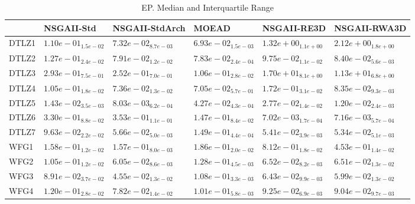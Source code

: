 \documentclass{article}
\begin{document}
\begin{table}
\caption{EP. Median and Interquartile Range}
\label{table: EP}
\centering
\begin{scriptsize}
\begin{tabular}{llllll}
\hline & NSGAII-Std & NSGAII-StdArch & MOEAD & NSGAII-RE3D &  NSGAII-RWA3D\\
\hline 
DTLZ1 & $  1.10e-01_{ 1.5e-02}$ & \cellcolor{gray25}$  7.32e-02_{ 8.7e-03}$ & \cellcolor{gray95}$  6.93e-02_{ 1.5e-03}$ & $  1.32e+00_{ 1.1e+00}$ & $  2.12e+00_{ 1.8e+00}$ \\
DTLZ2 & $  1.27e-01_{ 2.4e-02}$ & \cellcolor{gray25}$  7.91e-02_{ 1.2e-02}$ & \cellcolor{gray95}$  7.83e-02_{ 2.4e-04}$ & $  9.75e-02_{ 1.1e-02}$ & $  8.40e-02_{ 5.6e-03}$ \\
DTLZ3 & $  2.93e-01_{ 7.5e-01}$ & \cellcolor{gray25}$  2.52e-01_{ 7.0e-01}$ & \cellcolor{gray95}$  1.06e-01_{ 2.8e-02}$ & $  1.70e+01_{ 8.1e+00}$ & $  1.13e+01_{ 6.8e+00}$ \\
DTLZ4 & $  1.05e-01_{ 1.8e-02}$ & \cellcolor{gray25}$  7.36e-02_{ 1.3e-02}$ & \cellcolor{gray95}$  7.05e-02_{ 5.7e-01}$ & $  1.72e-01_{ 3.1e-02}$ & $  8.35e-02_{ 9.3e-03}$ \\
DTLZ5 & $  1.43e-02_{ 3.5e-03}$ & \cellcolor{gray95}$  8.03e-03_{ 6.2e-04}$ & $  4.27e-02_{ 4.3e-04}$ & $  2.77e-02_{ 1.4e-02}$ & \cellcolor{gray25}$  1.20e-02_{ 2.4e-03}$ \\
DTLZ6 & $  3.30e-01_{ 8.8e-02}$ & $  3.53e-01_{ 1.1e-01}$ & $  1.47e-01_{ 8.4e-02}$ & \cellcolor{gray95}$  7.02e-03_{ 1.7e-04}$ & \cellcolor{gray25}$  7.16e-03_{ 5.7e-04}$ \\
DTLZ7 & $  9.63e-02_{ 2.2e-02}$ & $  5.66e-02_{ 5.0e-03}$ & $  1.49e-01_{ 4.4e-04}$ & \cellcolor{gray25}$  5.41e-02_{ 3.9e-03}$ & \cellcolor{gray95}$  5.34e-02_{ 5.1e-03}$ \\
WFG1 & \cellcolor{gray25}$  1.58e-01_{ 1.2e-02}$ & \cellcolor{gray95}$  1.57e-01_{ 8.0e-03}$ & $  1.86e-01_{ 2.0e-02}$ & $  8.12e-01_{ 1.8e-02}$ & $  4.53e-01_{ 1.4e-02}$ \\
WFG2 & $  1.05e-01_{ 1.2e-02}$ & \cellcolor{gray95}$  6.05e-02_{ 8.6e-03}$ & $  1.28e-01_{ 4.5e-03}$ & $  6.52e-02_{ 8.2e-03}$ & \cellcolor{gray25}$  6.51e-02_{ 1.3e-02}$ \\
WFG3 & $  8.91e-02_{ 3.7e-02}$ & \cellcolor{gray95}$  4.55e-02_{ 1.3e-02}$ & $  1.08e-01_{ 3.3e-03}$ & $  6.43e-02_{ 9.9e-03}$ & \cellcolor{gray25}$  5.99e-02_{ 1.3e-02}$ \\
WFG4 & $  1.20e-01_{ 2.8e-02}$ & \cellcolor{gray95}$  7.82e-02_{ 1.4e-02}$ & $  1.01e-01_{ 5.8e-03}$ & $  9.25e-02_{ 6.9e-03}$ & \cellcolor{gray25}$  9.04e-02_{ 9.7e-03}$ \\

\end{tabular}
\end{scriptsize}
\end{table}
\end{document}
